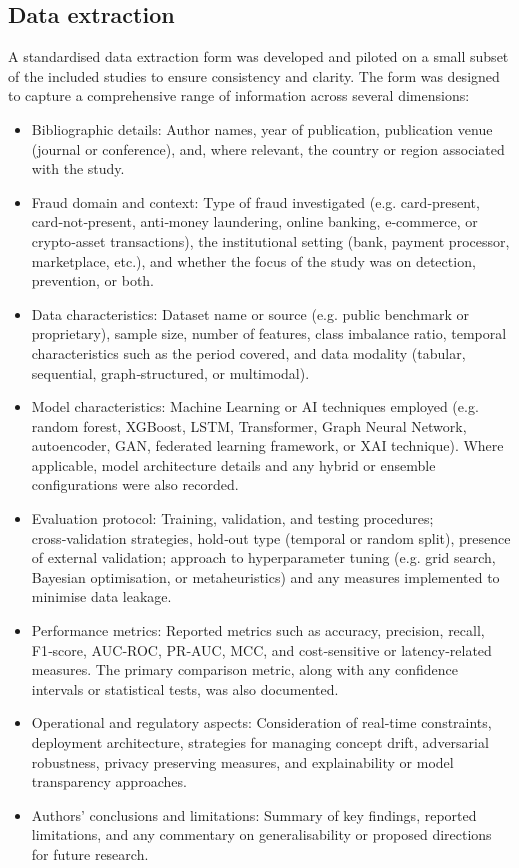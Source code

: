 \documentclass[a4paper,fleqn]{cas-dc}
\begin{document}
\subsection{Data extraction}
A standardised data extraction form was developed and piloted on a small subset of the included studies to ensure consistency and clarity. 
The form was designed to capture a comprehensive range of information across several dimensions:
\begin{itemize}
\item Bibliographic details: Author names, year of publication, publication venue (journal or conference), and, where relevant, the country or region associated with the study.

\item Fraud domain and context: Type of fraud investigated (e.g. card‑present, card‑not‑present, anti‑money laundering, online banking, e‑commerce, or crypto‑asset transactions), the institutional setting (bank, payment processor, marketplace, etc.), and whether the focus of the study was on detection, prevention, or both.

\item Data characteristics: Dataset name or source (e.g. public benchmark or proprietary), sample size, number of features, class imbalance ratio, temporal characteristics such as the period covered, and data modality (tabular, sequential, graph‑structured, or multimodal).

\item Model characteristics: Machine Learning or AI techniques employed (e.g. random forest, XGBoost, LSTM, Transformer, Graph Neural Network, autoencoder, GAN, federated learning framework, or XAI technique). Where applicable, model architecture details and any hybrid or ensemble configurations were also recorded.

\item Evaluation protocol: Training, validation, and testing procedures; cross‑validation strategies, hold‑out type (temporal or random split), presence of external validation; approach to hyperparameter tuning (e.g. grid search, Bayesian optimisation, or metaheuristics) and any measures implemented to minimise data leakage.

\item Performance metrics: Reported metrics such as accuracy, precision, recall, F1‑score, AUC‑ROC, PR‑AUC, MCC, and cost‑sensitive or latency‑related measures. 
The primary comparison metric, along with any confidence intervals or statistical tests, was also documented.

\item Operational and regulatory aspects: Consideration of real‑time constraints, deployment architecture, strategies for managing concept drift, adversarial robustness, privacy preserving measures, and explainability or model transparency approaches.

\item Authors’ conclusions and limitations: Summary of key findings, reported limitations, and any commentary on generalisability or proposed directions for future research.
\end{itemize}
\end{document}
